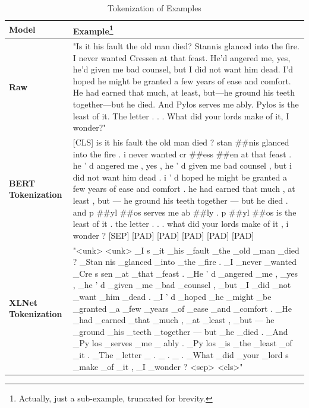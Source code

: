 \documentclass[twoside,twocolumn,10pt]{article}
\begin{document}
\begin{table}[t]
	\small
	\caption{Tokenization of Examples}\label{tab:tokens}
	\centering
	\begin{tabular}{R{3.0cm} p{11cm}}
		\toprule
		\textbf{Model} & \textbf{Example}\footnote{Actually, just a sub-example, truncated for brevity.}  \\
		\midrule
		\textbf{Raw}  & "Is it his fault the old man died? Stannis glanced into the fire.  I never wanted Cressen at that feast. He’d angered me, yes, he’d given me bad counsel, but I did not want him dead.  I’d hoped he might be granted a few years of ease and comfort. He had earned that much, at least, but—he ground his teeth together—but he died. And Pylos serves me ably.  Pylos is the least of it. The letter . . . What did your lords make of it, I wonder?"\\
		\textbf{BERT Tokenization}  &   [CLS] is it his fault the old man died ? stan \#\#nis glanced into the fire . i never wanted cr \#\#ess \#\#en at that feast . he ’ d angered me , yes , he ’ d given me bad counsel , but i did not want him dead . i ’ d hoped he might be granted a few years of ease and comfort . he had earned that much , at least , but — he ground his teeth together — but he died . and p \#\#yl \#\#os serves me ab \#\#ly . p \#\#yl \#\#os is the least of it . the letter . . . what did your lords make of it , i wonder ? [SEP] [PAD] [PAD] [PAD] [PAD] [PAD]\\
		\textbf{XLNet Tokenization}  &  "<unk> <unk> \_I s \_it \_his \_fault \_the \_old \_man \_died ? \_Stan nis \_glanced \_into \_the \_fire . \_I \_never \_wanted \_Cre s sen \_at \_that \_feast . \_He ’ d \_angered \_me , \_yes , \_he ’ d \_given \_me \_bad \_counsel , \_but \_I \_did \_not \_want \_him \_dead . \_I ’ d \_hoped \_he \_might \_be \_granted \_a \_few \_years \_of \_ease \_and \_comfort . \_He \_had \_earned \_that \_much , \_at \_least , \_but — he \_ground \_his \_teeth \_together — but \_he \_died . \_And \_Py los \_serves \_me \_ ably . \_Py los \_is \_the \_least \_of \_it . \_The \_letter \_ . \_ . \_ . \_What \_did \_your \_lord s \_make \_of \_it , \_I \_wonder ? <sep> <cls>"\\
		\bottomrule
	\end{tabular}
\end{table} 
\end{document}
